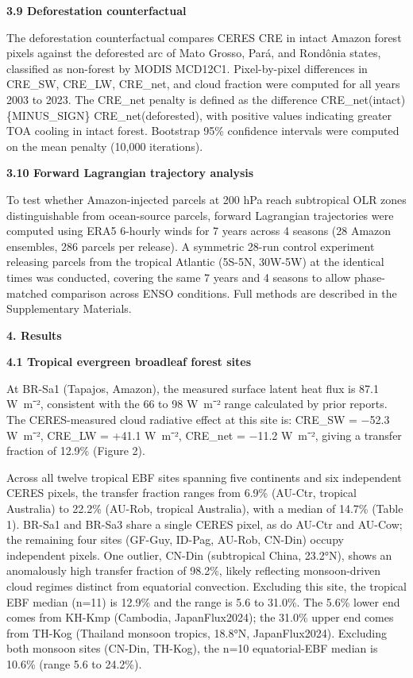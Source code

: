 \textbf{3.9 Deforestation counterfactual}

The deforestation counterfactual compares CERES CRE in intact Amazon
forest pixels against the deforested arc of Mato Grosso, Pará, and
Rondônia states, classified as non-forest by MODIS MCD12C1.
Pixel-by-pixel differences in CRE\_SW, CRE\_LW, CRE\_net, and cloud
fraction were computed for all years 2003 to 2023. The CRE\_net penalty
is defined as the difference CRE\_net(intact) \{MINUS\_SIGN\}
CRE\_net(deforested), with positive values indicating greater TOA
cooling in intact forest. Bootstrap 95\% confidence intervals were
computed on the mean penalty (10,000 iterations).

\textbf{3.10 Forward Lagrangian trajectory analysis}

To test whether Amazon-injected parcels at 200 hPa reach subtropical OLR
zones distinguishable from ocean-source parcels, forward Lagrangian
trajectories were computed using ERA5 6-hourly winds for 7 years across
4 seasons (28 Amazon ensembles, 286 parcels per release). A symmetric
28-run control experiment releasing parcels from the tropical Atlantic
(5S-5N, 30W-5W) at the identical times was conducted, covering the
same 7 years and 4 seasons to allow phase-matched comparison across
ENSO conditions. Full methods are described in the Supplementary
Materials.

\textbf{4. Results}

\textbf{4.1 Tropical evergreen broadleaf forest sites}

At BR-Sa1 (Tapajos, Amazon), the measured surface latent heat flux is
87.1 W~m⁻², consistent with the 66 to 98 W~m⁻² range calculated by
prior reports. The CERES-measured cloud radiative effect at this
site is: CRE\_SW = −52.3 W~m⁻², CRE\_LW = +41.1 W~m⁻², CRE\_net = −11.2
W~m⁻², giving a transfer fraction of 12.9\% (Figure 2).

Across all twelve tropical EBF sites spanning five continents and six
independent CERES pixels, the transfer fraction ranges from 6.9\%
(AU-Ctr, tropical Australia) to 22.2\% (AU-Rob, tropical Australia),
with a median of 14.7\% (Table 1). BR-Sa1 and BR-Sa3 share a single
CERES pixel, as do AU-Ctr and AU-Cow; the remaining four sites (GF-Guy,
ID-Pag, AU-Rob, CN-Din) occupy independent pixels. One outlier, CN-Din
(subtropical China, 23.2°N), shows an anomalously high transfer fraction
of 98.2\%, likely reflecting monsoon-driven cloud regimes distinct from
equatorial convection. Excluding this site, the tropical EBF median (n=11) is
12.9\% and the range is 5.6 to 31.0\%. The 5.6\% lower end comes from
KH-Kmp (Cambodia, JapanFlux2024); the 31.0\% upper end comes from
TH-Kog (Thailand monsoon tropics, 18.8°N, JapanFlux2024). Excluding
both monsoon sites (CN-Din, TH-Kog), the n=10 equatorial-EBF median is
10.6\% (range 5.6 to 24.2\%).

